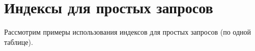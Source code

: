 \section{Индексы для простых запросов}

Рассмотрим примеры использования индексов для простых запросов (по одной таблице).






